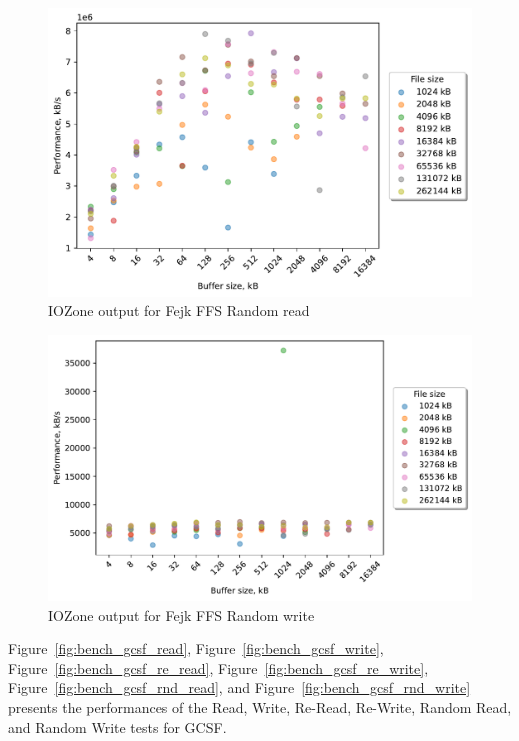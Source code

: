 \begin{figure}[!htb]
	\label{fig:bench_fffs_rnd_read}
	\begin{center}
		\includegraphics[width=1.0\textwidth]{figures/benchmarking/fejk-ffs/Random read.pdf}
	\end{center}
	\caption{IOZone output for Fejk FFS Random read}
\end{figure}

\begin{figure}[!htb]
	\label{fig:bench_fffs_rnd_write}
	\begin{center}
		\includegraphics[width=1.0\textwidth]{figures/benchmarking/fejk-ffs/Random write.pdf}
	\end{center}
	\caption{IOZone output for Fejk FFS Random write}
\end{figure}

\FloatBarrier

Figure~\ref{fig:bench_gcsf_read}, Figure~\ref{fig:bench_gcsf_write}, Figure~\ref{fig:bench_gcsf_re_read}, Figure~\ref{fig:bench_gcsf_re_write}, Figure~\ref{fig:bench_gcsf_rnd_read}, and Figure~\ref{fig:bench_gcsf_rnd_write} presents the performances of the Read, Write, \mbox{Re-Read}, \mbox{Re-Write}, Random Read, and Random Write tests for \gls{GCSF}.

